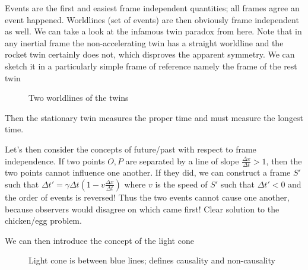 \documentclass[10pt]{report}
\begin{document}
Events are the first and easiest frame independent quantities; all frames agree an event happened. Worldlines (set of events) are then obviously frame independent as well. We can take a look at the infamous twin paradox from here. Note that in any inertial frame the non-accelerating twin has a straight worldline and the rocket twin certainly does not, which disproves the apparent symmetry. We can sketch it in a particularly simple frame of reference namely the frame of the rest twin
\begin{figure}[!h]
    \centering
    \caption{Two worldlines of the twins}
    \label{1.9.twinsLine}
\end{figure}

Then the stationary twin measures the proper time and must measure the longest time.

Let's then consider the concepts of future/past with respect to frame independence. If two points $O, P$ are separated by a line of slope $\frac{\Delta x}{\Delta t} > 1$, then the two points cannot influence one another. If they did, we can construct a frame $S'$ such that $\Delta t' = \gamma \Delta t\left( 1 - v\frac{\Delta x}{\Delta t} \right)$ where $v$ is the speed of $S'$ such that $\Delta t' < 0$ and the order of events is reversed! Thus the two events cannot cause one another, because observers would disagree on which came first! Clear solution to the chicken/egg problem.

We can then introduce the concept of the light cone
\begin{figure}[!h]
    \centering
    \caption{Light cone is between blue lines; defines causality and non-causality}
    \label{1.9.lightcone}
\end{figure}
\end{document}
